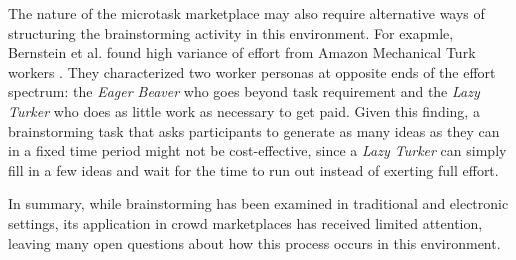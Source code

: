 The nature of the microtask marketplace may also require alternative ways of structuring the brainstorming activity in this environment.
For exapmle, Bernstein et al. found high variance of effort from Amazon Mechanical Turk workers \cite{soylent}. They characterized two worker personas at opposite ends of the effort spectrum: the {\em Eager Beaver\/} who goes beyond task requirement and the {\em Lazy Turker\/} who does as little work as necessary to get paid. Given this finding, a brainstorming task that asks participants to generate as many ideas as they can in a fixed time period might not be cost-effective, since a {\em Lazy Turker\/} can simply fill in a few ideas and wait for the time to run out instead of exerting full effort.




In summary, while brainstorming has been examined in traditional and electronic settings, its application in crowd marketplaces has received limited attention, leaving many open questions about how this process occurs in this environment.

